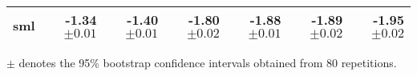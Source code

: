 \begin{table*}
\begin{threeparttable}
\begin{tabular}{lrrrrrr}
    sml & {\bf-1.34 {\scriptsize{\(\pm 0.01\)}}} & {-1.40 {\scriptsize{\(\pm 0.01\)}}} & {-1.80 {\scriptsize{\(\pm 0.02\)}}} & {-1.88 {\scriptsize{\(\pm 0.01\)}}} & {-1.89 {\scriptsize{\(\pm 0.02\)}}} & {-1.95 {\scriptsize{\(\pm 0.02\)}}} \\\bottomrule
  \end{tabular}
  \begin{tablenotes}
    \item[]{\footnotesize \(\pm\) denotes the 95\% bootstrap confidence intervals obtained from 80 repetitions.}
  \end{tablenotes}
  \end{threeparttable}
  \vspace{-0.15in}
\end{table*}

